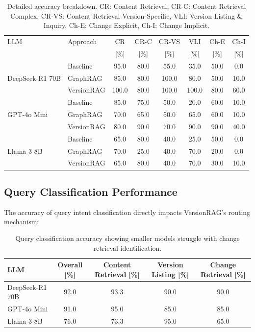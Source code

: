 \begin{table}[hb]
\centering
\small
\caption{Detailed accuracy breakdown. CR: Content Retrieval, CR-C: Content Retrieval Complex, CR-VS: Content Retrieval Version-Specific, VLI: Version Listing \& Inquiry, Ch-E: Change Explicit, Ch-I: Change Implicit.}
\begin{tabular}{llcccccc}
\hline
LLM & Approach & CR & CR-C & CR-VS & VLI & Ch-E & Ch-I \\
& & [\%] & [\%] & [\%] & [\%] & [\%] & [\%] \\ \hline
\multirow{3}{*}{DeepSeek-R1 70B} 
& Baseline & 95.0 & 80.0 & 55.0 & 35.0 & 50.0 & 0.0 \\
& GraphRAG & 85.0 & 80.0 & 100.0 & 80.0 & 50.0 & 10.0 \\
& VersionRAG & 100.0 & 80.0 & 100.0 & 100.0 & 80.0 & 60.0 \\ \hline
\multirow{3}{*}{GPT-4o Mini} 
& Baseline & 85.0 & 75.0 & 50.0 & 20.0 & 60.0 & 10.0 \\
& GraphRAG & 70.0 & 65.0 & 50.0 & 65.0 & 60.0 & 10.0 \\
& VersionRAG & 80.0 & 90.0 & 70.0 & 90.0 & 90.0 & 40.0 \\ \hline
\multirow{3}{*}{Llama 3 8B} 
& Baseline & 65.0 & 80.0 & 40.0 & 25.0 & 50.0 & 0.0 \\
& GraphRAG & 70.0 & 25.0 & 40.0 & 70.0 & 20.0 & 0.0 \\
& VersionRAG & 65.0 & 80.0 & 40.0 & 70.0 & 30.0 & 10.0 \\ \hline
\end{tabular}
\label{tab:detailed_breakdown}
\end{table}

\subsection{Query Classification Performance}

The accuracy of query intent classification directly impacts VersionRAG's routing mechanism:

\begin{table}[hb]
\centering
\small
\caption{Query classification accuracy showing smaller models struggle with change retrieval identification.}
\begin{tabular}{lcccc}
\hline
LLM & Overall [\%] & Content Retrieval [\%] & Version Listing [\%] & Change Retrieval [\%] \\ \hline
DeepSeek-R1 70B & 92.0 & 93.3 & 90.0 & 90.0 \\
GPT-4o Mini & 91.0 & 95.0 & 85.0 & 85.0 \\
Llama 3 8B & 76.0 & 73.3 & 95.0 & 65.0 \\ \hline
\end{tabular}
\end{table}

